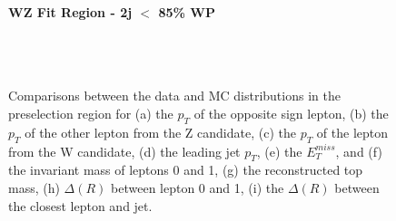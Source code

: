 \begin{figure}[H] 
    \centering
    \textbf{WZ Fit Region - 2j $<$ 85\% WP}\\
    \\
    \\
    \\
    \caption{Comparisons between the data and MC distributions in the preselection region for (a) the $p_T$ of the opposite sign lepton, (b) the $p_T$ of the other lepton from the Z candidate, (c) the $p_T$ of the lepton from the W candidate, (d) the leading jet $p_T$, (e) the $E_T^{miss}$, and (f) the invariant mass of leptons 0 and 1, (g) the reconstructed top mass, (h) $\Delta(R)$  between lepton 0 and 1, (i) the $\Delta(R)$ between the closest lepton and jet.}
    \label{kin:WP_2j_not85}
\end{figure}

